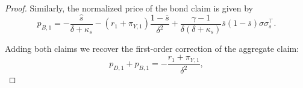\begin{proof}
Similarly, the normalized price of the bond claim is given by
\begin{equation}
    p_{B,1} = -\frac{\hat{s}}{\delta + \kappa_s} - (r_1 + \pi_{Y,1}) \frac{1-\overline{s}}{\delta^2} + \frac{\gamma-1}{\delta(\delta+\kappa_s)} \overline{s}(1-\overline{s}) \sigma \sigma_s^\top.
\end{equation}

Adding both claims we recover the first-order correction of the aggregate claim:
\begin{equation}
    p_{D,1} + p_{B,1} = -\frac{r_1 + \pi_{Y,1}}{\delta^2},
\end{equation}

\end{proof}






